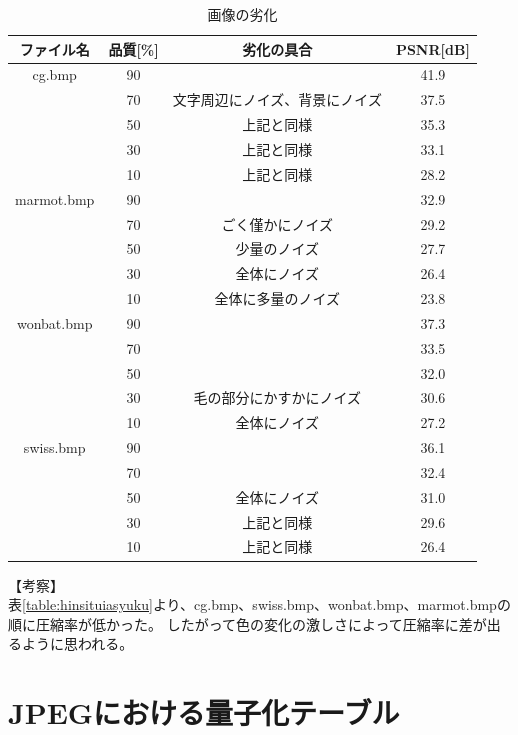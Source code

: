 \documentclass[uplatex, titlepage]{jsarticle}
\begin{document}
\begin{table}
  \centering
  \caption{画像の劣化}
  \label{table:gazourekka}
  \begin{tabular}{|c|c|c|c|} \hline
    ファイル名 & 品質[\%] & 劣化の具合 & PSNR[dB] \\ \hline
    cg.bmp & 90 &  & 41.9   \\ \cline{2-4}
     & 70 & 文字周辺にノイズ、背景にノイズ & 37.5   \\ \cline{2-4}
     & 50 & 上記と同様 & 35.3   \\ \cline{2-4}
     & 30 & 上記と同様 & 33.1   \\ \cline{2-4}
     & 10 & 上記と同様 & 28.2   \\ \hline%
    marmot.bmp & 90 &  & 32.9 \\ \cline{2-4}%
     & 70 & ごく僅かにノイズ & 29.2   \\ \cline{2-4}
     & 50 & 少量のノイズ & 27.7   \\ \cline{2-4}
     & 30 & 全体にノイズ & 26.4   \\ \cline{2-4}
     & 10 & 全体に多量のノイズ & 23.8   \\ \hline%
    wonbat.bmp & 90 &  & 37.3  \\ \cline{2-4}%
     & 70 &  & 33.5   \\ \cline{2-4}
     & 50 &  & 32.0   \\ \cline{2-4}
     & 30 & 毛の部分にかすかにノイズ & 30.6   \\ \cline{2-4}
     & 10 & 全体にノイズ & 27.2   \\ \hline%
    swiss.bmp & 90 &  & 36.1   \\ \cline{2-4}%
     & 70 &  & 32.4   \\ \cline{2-4}
     & 50 & 全体にノイズ & 31.0   \\ \cline{2-4}
     & 30 & 上記と同様 & 29.6   \\ \cline{2-4}
     & 10 & 上記と同様 & 26.4   \\ \hline
  \end{tabular}
\end{table}

【考察】\\
  表\ref{table:hinsituiasyuku}より、cg.bmp、swiss.bmp、wonbat.bmp、marmot.bmpの順に圧縮率が低かった。
  したがって色の変化の激しさによって圧縮率に差が出るように思われる。\\

\section{JPEGにおける量子化テーブル}
\end{document}
